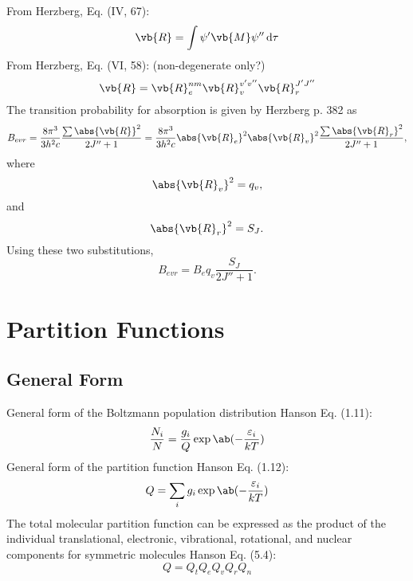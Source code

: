 \documentclass[11pt, twoside, fleqn]{report}
\begin{document}
    From Herzberg, Eq. (IV, 67):
    \begin{equation*}
        \vb{R} = \int \psi'\vb{M}\psi'' \odif{\tau}
    \end{equation*}
    From Herzberg, Eq. (VI, 58): (non-degenerate only?)
    \begin{equation*}
        \vb{R} = \vb{R}_e^{nm}\vb{R}_v^{v'v''}\vb{R}_r^{J'J''}
    \end{equation*}
    The transition probability for absorption is given by Herzberg p. 382 as
    \begin{equation*}
        B_{evr} = \frac{8\pi^3}{3h^2c}\frac{\sum\abs{\vb{R}}^2}{2J'' + 1} = \frac{8\pi^3}{3h^2c}\abs{\vb{R}_e}^2\abs{\vb{R}_v}^2\frac{\sum\abs{\vb{R}_r}^2}{2J'' + 1},
    \end{equation*}
    where
    \begin{equation*}
        \abs{\vb{R}_v}^2 = q_v,
    \end{equation*}
    and
    \begin{equation*}
        \abs{\vb{R}_r}^2 = S_J.
    \end{equation*}
    Using these two substitutions,
    \begin{equation*}
        B_{evr} = B_eq_v\frac{S_J}{2J'' + 1}.
    \end{equation*}

    \section{Partition Functions}

    \subsection{General Form}

    General form of the Boltzmann population distribution Hanson Eq. (1.11):
    \begin{equation*}
        \frac{N_i}{N} = \frac{g_i}{Q}\exp\ab(-\frac{\varepsilon_i}{kT})
    \end{equation*}
    General form of the partition function Hanson Eq. (1.12):
    \begin{equation*}
        Q = \sum_i g_i\exp\ab(-\frac{\varepsilon_i}{kT})
    \end{equation*}
    The total molecular partition function can be expressed as the product of the individual translational, electronic, vibrational, rotational, and nuclear components for symmetric molecules Hanson Eq. (5.4):
    \begin{equation*}
        Q = Q_tQ_eQ_vQ_rQ_n
    \end{equation*}
\end{document}
